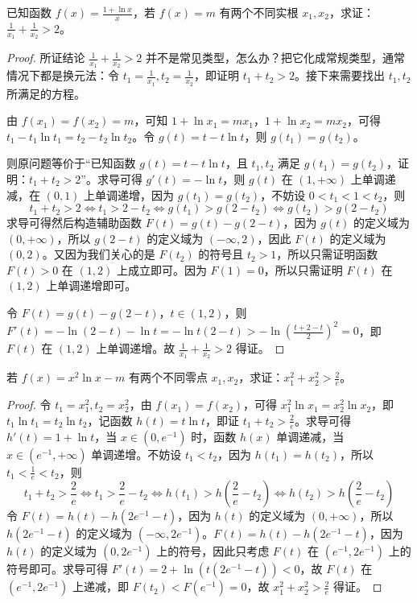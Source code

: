 \begin{example}
    已知函数 $f(x) = \frac{1 + \ln x}{x}$，若 $f(x) = m$ 有两个不同实根 $x_1, x_2$，求证：$\frac{1}{x_1} + \frac{1}{x_2} > 2$。
\end{example}

\begin{proof}
    所证结论 $\frac{1}{x_1} + \frac{1}{x_2} > 2$ 并不是常见类型，怎么办？把它化成常规类型，通常情况下都是换元法：令 $t_1 = \frac{1}{x_1}, t_2 = \frac{1}{x_2}$，即证明 $t_1 + t_2 > 2$。接下来需要找出 $t_1, t_2$ 所满足的方程。

由 $f(x_1) = f(x_2) = m$，可知 $1 + \ln x_1 = mx_1$，$1 + \ln x_2 = mx_2$，可得 $t_1 - t_1 \ln t_1 = t_2 - t_2 \ln t_2$。令 $g(t) = t - t \ln t$，则 $g(t_1) = g(t_2)$。

则原问题等价于“已知函数 $g(t) = t - t \ln t$，且 $t_1, t_2$ 满足 $g(t_1) = g(t_2)$，证明：$t_1 + t_2 > 2$”。求导可得 $g'(t) = -\ln t$，则 $g(t)$ 在 $(1, +\infty)$ 上单调递减，在 $(0, 1)$ 上单调递增，因为 $g(t_1) = g(t_2)$，不妨设 $0 < t_1 < 1 < t_2$，则
\[
t_1 + t_2 > 2 \Leftrightarrow t_1 > 2 - t_2 \Leftrightarrow g(t_1) > g(2 - t_2) \Leftrightarrow g(t_2) > g(2 - t_2)
\]
求导可得然后构造辅助函数 $F(t) = g(t) - g(2-t)$，因为 $g(t)$ 的定义域为 $(0, +\infty)$，所以 $g(2-t)$ 的定义域为 $(-\infty, 2)$，因此 $F(t)$ 的定义域为 $(0, 2)$。又因为我们关心的是 $F(t_2)$ 的符号且 $t_2 > 1$，所以只需证明函数 $F(t) > 0$ 在 $(1, 2)$ 上成立即可。因为 $F(1) = 0$，所以只需证明 $F(t)$ 在 $(1, 2)$ 上单调递增即可。

令 $F(t) = g(t) - g(2-t)$，$t \in (1, 2)$，则 $F'(t) = -\ln(2-t) - \ln t = -\ln t(2-t) > -\ln\left(\frac{t+2-t}{2}\right)^2 = 0$，即 $F(t)$ 在 $(1, 2)$ 上单调递增。故 $\frac{1}{x_1} + \frac{1}{x_2} > 2$ 得证。
\end{proof}
\begin{example}
    若 $f(x) = x^2 \ln x - m$ 有两个不同零点 $x_1, x_2$，求证：$x_1^2 + x_2^2 > \frac{2}{e}$。
\end{example}
\begin{proof}
    令 $t_1 = x_1^2, t_2 = x_2^2$，由 $f(x_1) = f(x_2)$，可得 $x_1^2 \ln x_1 = x_2^2 \ln x_2$，即 $t_1 \ln t_1 = t_2 \ln t_2$，记函数 $h(t) = t \ln t$，即证 $t_1 + t_2 > \frac{2}{e}$。求导可得 $h'(t) = 1 + \ln t$，当 $x \in \left(0, e^{-1}\right)$ 时，函数 $h(x)$ 单调递减，当 $x \in \left(e^{-1}, +\infty\right)$ 单调递增。不妨设 $t_1 < t_2$，因为 $h(t_1) = h(t_2)$，所以 $t_1 < \frac{1}{e} < t_2$，则
\[
t_1 + t_2 > \frac{2}{e} \Leftrightarrow t_1 > \frac{2}{e} - t_2 \Leftrightarrow h(t_1) > h\left(\frac{2}{e} - t_2\right) \Leftrightarrow h(t_2) > h\left(\frac{2}{e} - t_2\right)
\]
令 $F(t) = h(t) - h\left(2e^{-1} - t\right)$，因为 $h(t)$ 的定义域为 $(0, +\infty)$，所以 $h\left(2e^{-1} - t\right)$ 的定义域为 $(-\infty, 2e^{-1})$。$F(t) = h(t) - h\left(2e^{-1} - t\right)$，因为 $h(t)$ 的定义域为 $(0, 2e^{-1})$ 上的符号，因此只考虑 $F(t)$ 在 $(e^{-1}, 2e^{-1})$ 上的符号即可。求导可得 $F'(t) = 2 + \ln\left(t(2e^{-1} - t)\right) < 0$，故 $F(t)$ 在 $(e^{-1}, 2e^{-1})$ 上递减，即 $F(t_2) < F(e^{-1}) = 0$，故 $x_1^2 + x_2^2 > \frac{2}{e}$ 得证。
\end{proof}
